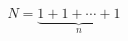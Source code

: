 \documentclass{article}
\begin{document}
\[
N = \underbrace{1 + 1 + \cdots + 1}_n
\]
\end{document}
